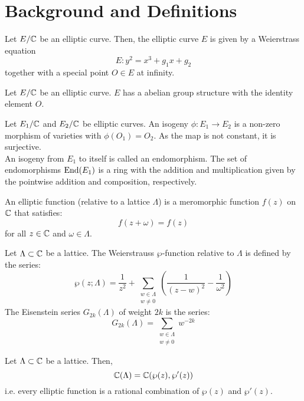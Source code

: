 \documentclass[12pt]{article}
\begin{document}


\section{Background and Definitions}

\begin{definition}
    Let $E/\mathbb C$ be an elliptic curve. Then, the elliptic curve $E$ is given by a Weierstrass equation
    \[ E: y^2 = x^3 + g_1x + g_2\]
    together with a special point $O \in E$ at infinity. 
\end{definition}

\begin{definition}
    Let $E/\mathbb C$ be an elliptic curve. $E$ has a abelian group structure with the identity element $O$. 
\end{definition}


\begin{definition}
    Let $E_1/\mathbb C$ and $E_2/\mathbb C$ be elliptic curves. An isogeny $\phi: E_1 \to E_2$ is a non-zero morphism of varieties with $\phi(O_1) = O_2$. As the map is not constant, it is surjective. \\   
    An isogeny from $E_1$ to itself is called an endomorphism. The set of endomorphisms $\operatorname{End}(E_1)$ is a ring with the addition and multiplication given by the pointwise addition and composition, respectively.
\end{definition}


\begin{definition}
    An elliptic function (relative to a lattice $\Lambda$) is a meromorphic function $f(z)$ on $\mathbb C$ that satisfies: 
    \[ f(z+\omega) = f(z) \]
    for all $z \in \mathbb C$ and $\omega \in \Lambda$.
\end{definition}

\begin{definition}
    Let $\Lambda \subset \mathbb C$ be a lattice. The Weierstrauss $\wp$-function relative to $\Lambda$ is defined by the series: 
    \[ \wp(z; \Lambda) = \frac{1}{z^2} + \sum_{\substack{w \in \Lambda \\ w \ne 0}} \left( \frac{1}{(z-w)^2} - \frac{1}{\omega^2}\right)\]
    The Eisenstein series $G_{2k}(\Lambda)$ of weight $2k$ is the series:
    \[ G_{2k}(\Lambda) = \sum_{\substack{w \in \Lambda \\ w \ne 0} }w^{-2k}\]
\end{definition}

\begin{prop}
    Let $\Lambda \subset \mathbb C$ be a lattice. Then, 
    \[ \mathbb C(\Lambda) = \mathbb C(\wp(z), \wp'(z))\]
    i.e. every elliptic function is a rational combination of $\wp(z)$ and $\wp'(z)$.
\end{prop}
\end{document}

